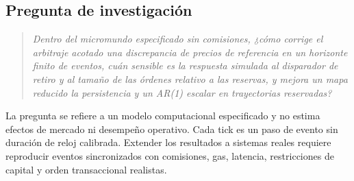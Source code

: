 \FloatBarrier
\begin{samepage}
\section{Pregunta de investigación}

\begin{quote}
\emph{Dentro del micromundo especificado sin comisiones, ¿cómo corrige el arbitraje acotado una discrepancia de precios de referencia en un horizonte finito de eventos, cuán sensible es la respuesta simulada al disparador de retiro y al tamaño de las órdenes relativo a las reservas, y mejora un mapa reducido la persistencia y un AR(1) escalar en trayectorias reservadas?}
\end{quote}
\end{samepage}

La pregunta se refiere a un modelo computacional especificado y no estima efectos de mercado ni desempeño operativo. Cada tick es un paso de evento sin duración de reloj calibrada. Extender los resultados a sistemas reales requiere reproducir eventos sincronizados con comisiones, gas, latencia, restricciones de capital y orden transaccional realistas.
